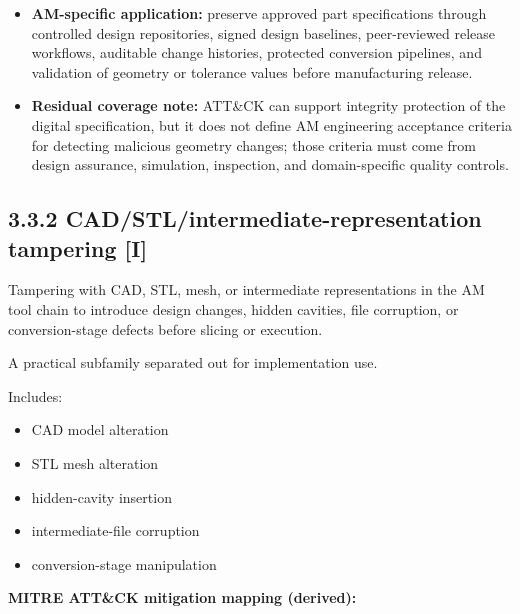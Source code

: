 \documentclass[10pt,a4paper,oneside]{report}
\begin{document}
\begin{itemize}
\item \textbf{AM-specific application:} preserve approved part specifications through controlled design repositories, signed design baselines, peer-reviewed release workflows, auditable change histories, protected conversion pipelines, and validation of geometry or tolerance values before manufacturing release.
\end{itemize}

\begin{itemize}
\item \textbf{Residual coverage note:} ATT\&CK can support integrity protection of the digital specification, but it does not define AM engineering acceptance criteria for detecting malicious geometry changes; those criteria must come from design assurance, simulation, inspection, and domain-specific quality controls.
\end{itemize}


\subsection{3.3.2 CAD/STL/intermediate-representation tampering [I]}


Tampering with CAD, STL, mesh, or intermediate representations in the AM tool chain to introduce design changes, hidden cavities, file corruption, or conversion-stage defects before slicing or execution.

A practical subfamily separated out for implementation use.

Includes:

\begin{itemize}
\item CAD model alteration
\item STL mesh alteration
\item hidden-cavity insertion
\item intermediate-file corruption
\item conversion-stage manipulation
\end{itemize}

\textbf{MITRE ATT\&CK mitigation mapping (derived):}
\end{document}
